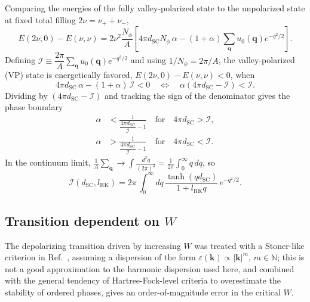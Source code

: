 Comparing the energies of the fully valley-polarized state to the unpolarized state at fixed total filling $2\nu = \nu_++\nu_-$,
\begin{equation}
    E(2\nu, 0) - E(\nu, \nu) = 2\nu^2 \frac{N_{\phi}}{A}\left[ 4\pi d_{\text{SC}} N_\phi\, \alpha - (1+\alpha) \sum_{\mathbf q} u_0(\mathbf q) e^{-q^2/2} \right].
    \label{eq:polarization_energy_diff}
\end{equation}
Defining $\mathcal{I} \equiv \dfrac{2\pi}{A}\sum_{\mathbf{q}} u_0(\mathbf{q}) e^{-q^2/2}$ and using $1/N_\phi = 2\pi/A$, the valley-polarized (VP) state is energetically favored, $E(2\nu,0)-E(\nu,\nu)<0$, when
\begin{equation}
    4\pi d_{\text{SC}}\, \alpha - (1+\alpha)\, \mathcal{I} < 0 \quad\Longleftrightarrow\quad \alpha\left(4\pi d_{\text{SC}} - \mathcal{I}\right) < \mathcal{I}.
    \label{eq:vp_favored_condition}
\end{equation}
Dividing by $(4\pi d_{\text{SC}} - \mathcal{I})$ and tracking the sign of the denominator gives the phase boundary
\begin{align}
    \alpha &< \frac{1}{\dfrac{4\pi d_{\text{SC}}}{\mathcal{I}} - 1} \quad \text{for} \quad 4\pi d_{\text{SC}} > \mathcal{I}, \label{eq:alpha_c_case1}\\
    \alpha &> \frac{1}{\dfrac{4\pi d_{\text{SC}}}{\mathcal{I}} - 1} \quad \text{for} \quad 4\pi d_{\text{SC}} < \mathcal{I}. \label{eq:alpha_c_case2}
\end{align}
In the continuum limit, $\frac{1}{A}\sum_{\mathbf{q}} \to \int \frac{d^2q}{{(2\pi)}^2} = \frac{1}{2\pi}\int_0^\infty q\,dq$, so
\begin{equation}
    \mathcal{I}(d_{\text{SC}}, l_{\text{RK}}) = 2\pi\, \int_0^\infty dq \, \frac{\tanh(q d_{\text{SC}})}{1 + l_{\text{RK}} q} \, e^{-q^2/2}.
    \label{eq:curly_I_continuum}
\end{equation}

\subsection{\texorpdfstring{Transition dependent on $W$}{Transition dependent on W}}\label{subsec:w_transition}

The depolarizing transition driven by increasing $W$ was treated with a Stoner-like criterion in Ref.~\cite{raines2024unconventional}, assuming a dispersion of the form $\varepsilon(\mathbf{k}) \propto |\mathbf{k}|^m$, $m\in\mathbb{N}$; this is not a good approximation to the harmonic dispersion used here, and combined with the general tendency of Hartree-Fock-level criteria to overestimate the stability of ordered phases, gives an order-of-magnitude error in the critical $W$.

